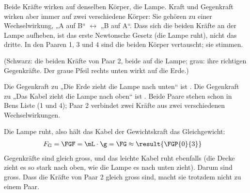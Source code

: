 \begin{abcliste}
\abc
{} Beide Kräfte wirken auf denselben Körper, die Lampe. Kraft und Gegenkraft wirken aber immer auf zwei verschiedene Körper: Sie gehören zu einer Wechselwirkung, „A auf B“ $\leftrightarrow$ „B auf A“. Dass sich die beiden Kräfte an der Lampe aufheben, ist das erste Newtonsche Gesetz (die Lampe ruht), nicht das dritte. In den Paaren 1, 3 und 4 sind die beiden Körper vertauscht; sie stimmen.

\begin{center}
\end{center}
(Schwarz: die beiden Kräfte von Paar 2, beide auf die Lampe; grau: ihre richtigen Gegenkräfte. Der graue Pfeil rechts unten wirkt auf die Erde.)

\abc
Die Gegenkraft zu „Die Erde zieht die Lampe nach unten“ ist . Die Gegenkraft zu „Das Kabel zieht die Lampe nach oben“ ist . Beide Paare stehen schon in Bens Liste (1 und 4); Paar 2 verbindet zwei Kräfte aus zwei verschiedenen Wechselwirkungen.

\abc
Die Lampe ruht, also hält das Kabel der Gewichtskraft das Gleichgewicht:
\begin{align}
 F_\mathrm{G} &= \FGF = \mL\cdot\g = \FG \approx \result{\FGP{0}{3}}
\end{align}
Gegenkräfte sind gleich gross, und das leichte Kabel ruht ebenfalls (die Decke zieht es so stark nach oben, wie die Lampe es nach unten zieht). Darum sind  gross. Dass die Kräfte von Paar 2 gleich gross sind, macht sie trotzdem nicht zu einem Paar.
\end{abcliste}

